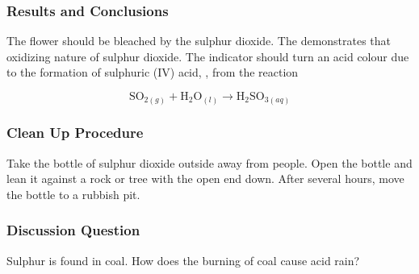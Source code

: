 \subsubsection{Results and Conclusions}
The flower should be bleached by the sulphur dioxide. The demonstrates that oxidizing nature of sulphur dioxide. The indicator should turn an acid colour due to the formation of sulphuric (IV) acid, , from the reaction

$$\mathrm{SO}_{2(g)} + \mathrm{H}_2\mathrm{O}_{(l)} \longrightarrow \mathrm{H}_2\mathrm{SO}_{3(aq)}$$

\subsubsection*{Clean Up Procedure}
Take the bottle of sulphur dioxide outside away from people. Open the bottle and lean it against a rock or tree with the open end down. After several hours, move the bottle to a rubbish pit.

\subsubsection*{Discussion Question}
Sulphur is found in coal. How does the burning of coal cause acid rain?